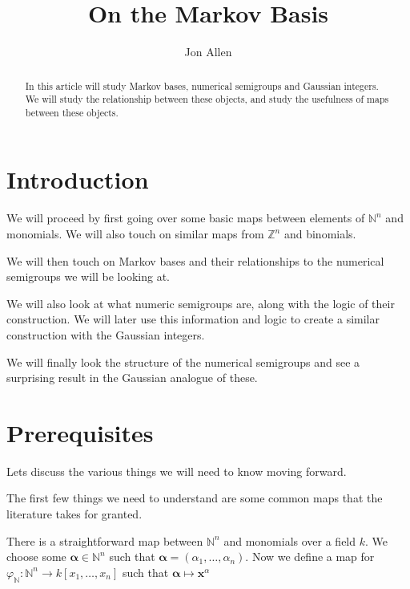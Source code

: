 \documentclass[11pt]{amsart}
\theoremstyle{plain}
\theoremstyle{definition}
\begin{document}
\title{On the Markov Basis}
\author{Jon Allen}
\begin{abstract}
In this article will study Markov bases, numerical semigroups and Gaussian integers. We will study the relationship between these objects, and study  the usefulness of maps between these objects.
\end{abstract}
\maketitle
\section{Introduction}
We will proceed by first going over some basic maps between elements of $\mathbb{N}^n$ and monomials. We will also touch on similar maps from $\mathbb{Z}^n$ and binomials.

We will then touch on Markov bases and their relationships to the numerical semigroups we will be looking at.

We will also look at what numeric semigroups are, along with the logic of their construction. We will later use this information and logic to create a similar construction with the Gaussian integers.

We will finally look the structure of the numerical semigroups and see a surprising result in the Gaussian analogue of these.
\section{Prerequisites}
Lets discuss the various things we will need to know moving forward.

The first few things we need to understand are some common maps that the literature takes for granted.

There is a straightforward map between $\mathbb{N}^n$ and monomials over a field $k$.
We choose some $\mathbf{\alpha}\in \mathbb{N}^n$ such that $\mathbf{\alpha}=(\alpha_1,\dots,\alpha_n)$.
Now we define a map for $\varphi_\mathbb{N}:\mathbb{N}^n\to k[x_1,\dots,x_n]$ such that $\mathbf{\alpha}\mapsto \mathbf{x}^\alpha$
\end{document}
